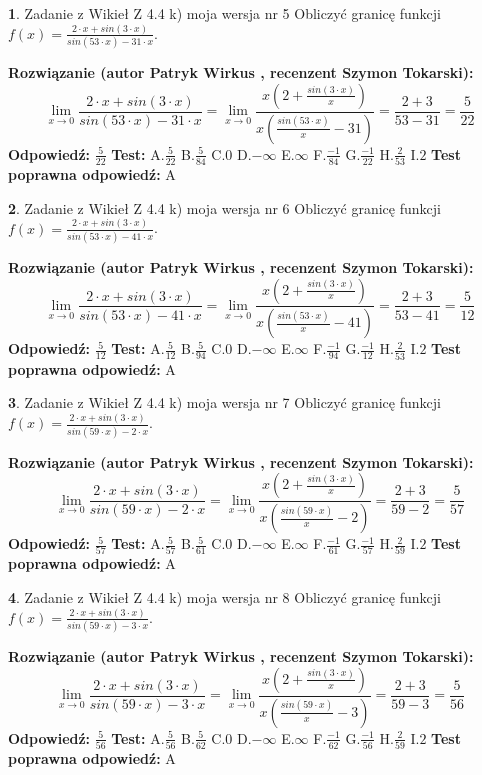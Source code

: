 \documentclass[12pt, a4paper]{article}
\theoremstyle{definition} %
\newtheorem{zad}{}
\newcommand{\zadStart}[1]{\begin{zad}#1\newline}
\newcommand{\zadStop}{\end{zad}}
\newcommand{\rozwStart}[2]{\noindent \textbf{Rozwiązanie (autor #1 , recenzent #2): }\newline}
\newcommand{\rozwStop}{\newline}
\newcommand{\odpStart}{\noindent \textbf{Odpowiedź:}\newline}
\newcommand{\odpStop}{\newline}
\newcommand{\testStart}{\noindent \textbf{Test:}\newline}
\newcommand{\testStop}{\newline}
\newcommand{\kluczStart}{\noindent \textbf{Test poprawna odpowiedź:}\newline}
\newcommand{\kluczStop}{\newline}
\begin{document}
\zadStart{Zadanie z Wikieł Z 4.4 k) moja wersja nr 5}
Obliczyć granicę funkcji $f(x)=\frac{2\cdot x +sin(3\cdot x)}{sin(53\cdot x) -31\cdot x}$.
\zadStop
\rozwStart{Patryk Wirkus}{Szymon Tokarski}
$$\lim\limits_{x\to 0}\frac{2\cdot x +sin(3\cdot x)}{sin(53\cdot x) -31\cdot x}
=\lim\limits_{x\to 0}\frac{x(2+\frac{sin(3\cdot x)}{x})}{x(\frac{sin(53\cdot x)}{x}-31)}
=\frac{2+3}{53-31} = \frac{5}{22}$$
\rozwStop
\odpStart
$\frac{5}{22}$
\odpStop
\testStart
A.$\frac{5}{22}$
B.$\frac{5}{84}$
C.$0$
D.$-\infty$
E.$\infty$
F.$\frac{-1}{84}$
G.$\frac{-1}{22}$
H.$\frac{2}{53}$
I.$2$
\testStop
\kluczStart
A
\kluczStop



\zadStart{Zadanie z Wikieł Z 4.4 k) moja wersja nr 6}
Obliczyć granicę funkcji $f(x)=\frac{2\cdot x +sin(3\cdot x)}{sin(53\cdot x) -41\cdot x}$.
\zadStop
\rozwStart{Patryk Wirkus}{Szymon Tokarski}
$$\lim\limits_{x\to 0}\frac{2\cdot x +sin(3\cdot x)}{sin(53\cdot x) -41\cdot x}
=\lim\limits_{x\to 0}\frac{x(2+\frac{sin(3\cdot x)}{x})}{x(\frac{sin(53\cdot x)}{x}-41)}
=\frac{2+3}{53-41} = \frac{5}{12}$$
\rozwStop
\odpStart
$\frac{5}{12}$
\odpStop
\testStart
A.$\frac{5}{12}$
B.$\frac{5}{94}$
C.$0$
D.$-\infty$
E.$\infty$
F.$\frac{-1}{94}$
G.$\frac{-1}{12}$
H.$\frac{2}{53}$
I.$2$
\testStop
\kluczStart
A
\kluczStop



\zadStart{Zadanie z Wikieł Z 4.4 k) moja wersja nr 7}
Obliczyć granicę funkcji $f(x)=\frac{2\cdot x +sin(3\cdot x)}{sin(59\cdot x) -2\cdot x}$.
\zadStop
\rozwStart{Patryk Wirkus}{Szymon Tokarski}
$$\lim\limits_{x\to 0}\frac{2\cdot x +sin(3\cdot x)}{sin(59\cdot x) -2\cdot x}
=\lim\limits_{x\to 0}\frac{x(2+\frac{sin(3\cdot x)}{x})}{x(\frac{sin(59\cdot x)}{x}-2)}
=\frac{2+3}{59-2} = \frac{5}{57}$$
\rozwStop
\odpStart
$\frac{5}{57}$
\odpStop
\testStart
A.$\frac{5}{57}$
B.$\frac{5}{61}$
C.$0$
D.$-\infty$
E.$\infty$
F.$\frac{-1}{61}$
G.$\frac{-1}{57}$
H.$\frac{2}{59}$
I.$2$
\testStop
\kluczStart
A
\kluczStop



\zadStart{Zadanie z Wikieł Z 4.4 k) moja wersja nr 8}
Obliczyć granicę funkcji $f(x)=\frac{2\cdot x +sin(3\cdot x)}{sin(59\cdot x) -3\cdot x}$.
\zadStop
\rozwStart{Patryk Wirkus}{Szymon Tokarski}
$$\lim\limits_{x\to 0}\frac{2\cdot x +sin(3\cdot x)}{sin(59\cdot x) -3\cdot x}
=\lim\limits_{x\to 0}\frac{x(2+\frac{sin(3\cdot x)}{x})}{x(\frac{sin(59\cdot x)}{x}-3)}
=\frac{2+3}{59-3} = \frac{5}{56}$$
\rozwStop
\odpStart
$\frac{5}{56}$
\odpStop
\testStart
A.$\frac{5}{56}$
B.$\frac{5}{62}$
C.$0$
D.$-\infty$
E.$\infty$
F.$\frac{-1}{62}$
G.$\frac{-1}{56}$
H.$\frac{2}{59}$
I.$2$
\testStop
\kluczStart
A
\kluczStop
\end{document}
